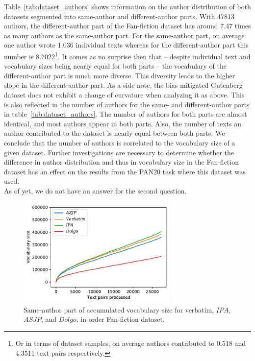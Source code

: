 Table~\ref{tab:dataset_authors} shows information on the author distribution of both datasets segmented into same-author and different-author parts.
With 47813 authors, the different-author part of the Fan-fiction dataset has around 7.47 times as many authors as the same-author part.
For the same-author part, on average one author wrote 1.036 individual texts whereas for the different-author part this number is 8.7022\footnote{Or in terms of dataset samples, on average authors contributed to 0.518 and 4.3511 text pairs respectively.}.
It comes as no surprise then that -- despite individual text and vocabulary sizes being nearly equal for both parts -- the vocabulary of the different-author part is much more diverse.
This diversity leads to the higher slope in the different-author part.
As a side note, the bias-mitigated Gutenberg dataset does not exhibit a change of curvature when analyzing it as above.
This is also reflected in the number of authors for the same- and different-author parts in table~\ref{tab:dataset_authors}.
The number of authors for both parts are almost identical, and most authors appear in both parts.
Also, the number of texts an author contributed to the dataset is nearly equal between both parts.
We conclude that the number of authors is correlated to the vocabulary size of a given dataset.
Further investigations are necessary to determine whether the difference in author distribution and thus in vocabulary size in the Fan-fiction dataset has an effect on the results from the PAN20 task where this dataset was used.\\
As of yet, we do not have an answer for the second question.
\begin{figure}
  \centering
  \includegraphics[width=0.7\textwidth]{figures/cum_vocab_size_ff_inorder_onlysame_ipa}
  \caption{Same-author part of accumulated vocabulary size for verbatim, $IPA$, $ASJP$, and $Dolgo$, in-order Fan-fiction dataset.}
  \label{fig:cumvocab_same}
\end{figure}
